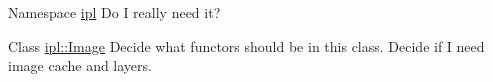 \label{todo__todo000003}
\hypertarget{todo__todo000003}{}
 
\begin{DoxyDescription}
\item[Namespace \hyperlink{namespaceipl}{ipl} ]Do I really need it? 
\end{DoxyDescription}

\label{todo__todo000001}
\hypertarget{todo__todo000001}{}
 
\begin{DoxyDescription}
\item[Class \hyperlink{classipl_1_1Image}{ipl::Image} ]Decide what functors should be in this class. Decide if I need image cache and layers. 
\end{DoxyDescription}